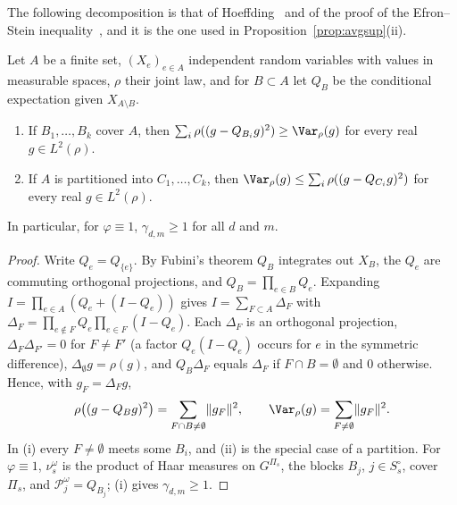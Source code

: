 The following decomposition is that of Hoeffding~\cite{Hoe48} and of the
proof of the Efron--Stein inequality~\cite{ES81}, and it is the one used in
Proposition~\ref{prop:avgsup}(ii).

\begin{lemma}\label{rC12:anova}
Let $A$ be a finite set, $(X_e)_{e\in A}$ independent random variables with
values in measurable spaces, $\rho$ their joint law, and for $B\subset A$
let $Q_B$ be the conditional expectation given $X_{A\setminus B}$.
\begin{enumerate}[label=\textup{(\roman*)},leftmargin=*]
\item If $B_1,\dots,B_k$ cover $A$, then $\sum_{i}\rho((g-Q_{B_i}g)^2)\ge
\Var_\rho(g)$ for every real $g\in L^2(\rho)$.
\item If $A$ is partitioned into $C_1,\dots,C_k$, then $\Var_\rho(g)\le
\sum_i\rho((g-Q_{C_i}g)^2)$ for every real $g\in L^2(\rho)$.
\end{enumerate}
In particular, for $\varphi\equiv1$, $\gamma_{d,m}\ge1$ for all $d$ and
$m$.
\end{lemma}

\begin{proof}
Write $Q_e=Q_{\{e\}}$. By Fubini's theorem $Q_B$ integrates out $X_B$, the
$Q_e$ are commuting orthogonal projections, and $Q_B=\prod_{e\in B}Q_e$.
Expanding $I=\prod_{e\in A}(Q_e+(I-Q_e))$ gives $I=\sum_{F\subset A}\Delta_F$
with $\Delta_F=\prod_{e\notin F}Q_e\prod_{e\in F}(I-Q_e)$. Each $\Delta_F$ is
an orthogonal projection, $\Delta_F\Delta_{F'}=0$ for $F\ne F'$ (a factor
$Q_e(I-Q_e)$ occurs for $e$ in the symmetric difference), $\Delta_\emptyset
g=\rho(g)$, and $Q_B\Delta_F$ equals $\Delta_F$ if $F\cap B=\emptyset$ and $0$
otherwise. Hence, with $g_F=\Delta_Fg$,
\[
\rho\bigl((g-Q_Bg)^2\bigr)=\sum_{F\cap B\ne\emptyset}\lVert g_F\rVert^2,
\qquad\Var_\rho(g)=\sum_{F\ne\emptyset}\lVert g_F\rVert^2 .
\]
In (i) every $F\ne\emptyset$ meets some $B_i$, and (ii) is the special case
of a partition. For $\varphi\equiv1$, $\nu^\omega_s$ is the product of Haar
measures on $G^{\Pi_s}$, the blocks $B_j$, $j\in S^\circ_s$, cover $\Pi_s$,
and $\mathcal P^\omega_j=Q_{B_j}$; (i) gives $\gamma_{d,m}\ge1$.
\end{proof}

